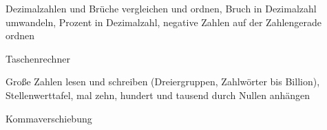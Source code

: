 \begin{aufgabe}{Dezimalzahlen und Brüche vergleichen und ordnen, Bruch in Dezimalzahl umwandeln, Prozent in Dezimalzahl, negative Zahlen auf der Zahlengerade ordnen}
\end{aufgabe}

\begin{aufgabe}{Taschenrechner}
\end{aufgabe}

\begin{aufgabe}{Große Zahlen lesen und schreiben (Dreiergruppen, Zahlwörter bis Billion), Stellenwerttafel, mal zehn, hundert und tausend durch Nullen anhängen}
\end{aufgabe}

\begin{aufgabe}{Kommaverschiebung}
\end{aufgabe}

